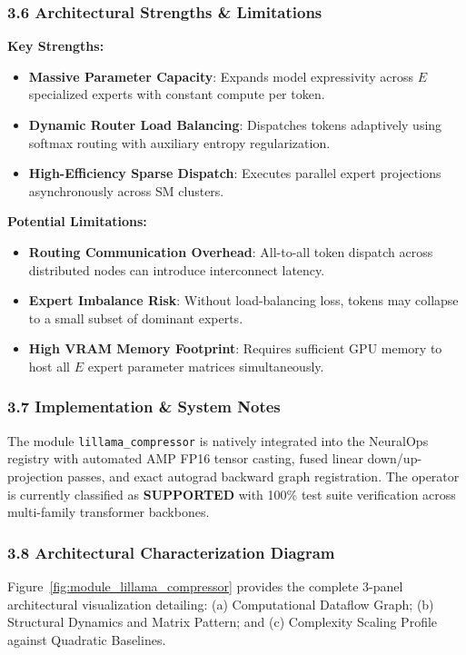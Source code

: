 \subsubsection*{3.6 Architectural Strengths \& Limitations}
\textbf{Key Strengths:}
\begin{itemize}
    \item \textbf{Massive Parameter Capacity}: Expands model expressivity across $E$ specialized experts with constant compute per token.
    \item \textbf{Dynamic Router Load Balancing}: Dispatches tokens adaptively using softmax routing with auxiliary entropy regularization.
    \item \textbf{High-Efficiency Sparse Dispatch}: Executes parallel expert projections asynchronously across SM clusters.
\end{itemize}

\textbf{Potential Limitations:}
\begin{itemize}
    \item \textbf{Routing Communication Overhead}: All-to-all token dispatch across distributed nodes can introduce interconnect latency.
    \item \textbf{Expert Imbalance Risk}: Without load-balancing loss, tokens may collapse to a small subset of dominant experts.
    \item \textbf{High VRAM Memory Footprint}: Requires sufficient GPU memory to host all $E$ expert parameter matrices simultaneously.
\end{itemize}

\subsubsection*{3.7 Implementation \& System Notes}
The module \texttt{lillama\_compressor} is natively integrated into the NeuralOps registry with automated AMP FP16 tensor casting, fused linear down/up-projection passes, and exact autograd backward graph registration. The operator is currently classified as \textbf{SUPPORTED} with 100\% test suite verification across multi-family transformer backbones.

\subsubsection*{3.8 Architectural Characterization Diagram}
Figure~\ref{fig:module_lillama_compressor} provides the complete 3-panel architectural visualization detailing: (a) Computational Dataflow Graph; (b) Structural Dynamics and Matrix Pattern; and (c) Complexity Scaling Profile against Quadratic Baselines.

